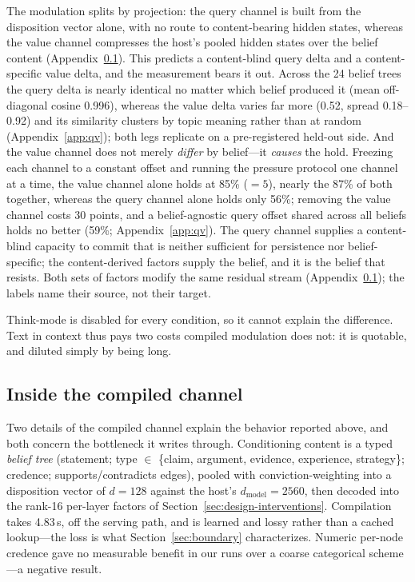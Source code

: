 The modulation splits by projection: the query channel is built from the disposition vector
alone, with no route to content-bearing hidden states, whereas the value channel compresses
the host's pooled hidden states over the belief content (Appendix~\ref{app:compiled-internals}). This
predicts a content-blind query delta and a content-specific value delta, and the measurement
bears it out. Across the 24 belief trees the query delta is nearly identical no matter which
belief produced it (mean off-diagonal cosine 0.996), whereas the value delta varies far more
(0.52, spread 0.18--0.92) and its similarity clusters by topic meaning rather than at random
(Appendix~\ref{app:qv}); both legs replicate on a pre-registered held-out
side. And the value channel does not merely
\emph{differ} by belief---it \emph{causes} the hold. Freezing each channel to a constant offset
and running the pressure protocol one channel at a time, the value channel alone holds at 85\%
(\(=5\)), nearly the 87\% of both together, whereas the query channel alone holds only 56\%;
removing the value channel costs 30 points, and a belief-agnostic query offset shared across all
beliefs holds no better (59\%; Appendix~\ref{app:qv}). The query channel
supplies a content-blind capacity to commit that is neither sufficient for persistence nor
belief-specific; the content-derived factors supply the belief, and it is the belief that
resists. Both sets of factors modify the same residual stream (Appendix~\ref{app:compiled-internals}); the labels name their source, not their target.

Think-mode is disabled for every condition, so it cannot explain the difference. Text in
context thus pays two costs compiled modulation does not: it is quotable, and diluted simply by
being long.

\subsection{Inside the compiled channel}
\label{app:compiled-internals}
Two details of the compiled channel explain the behavior reported above, and both concern the
bottleneck it writes through. Conditioning content is a typed \emph{belief tree} (statement;
type $\in$ \{claim, argument, evidence, experience, strategy\}; credence; supports/contradicts
edges), pooled with conviction-weighting into a disposition vector of \(d=128\) against the
host's \(d_{\text{model}}=2560\), then decoded into the rank-16 per-layer factors of
Section~\ref{sec:design-interventions}. Compilation takes 4.83\,s, off the serving path, and is
learned and lossy rather than a cached lookup---the loss is what
Section~\ref{sec:boundary} characterizes. Numeric per-node credence gave no measurable benefit in our runs
over a coarse categorical scheme---a negative result.

